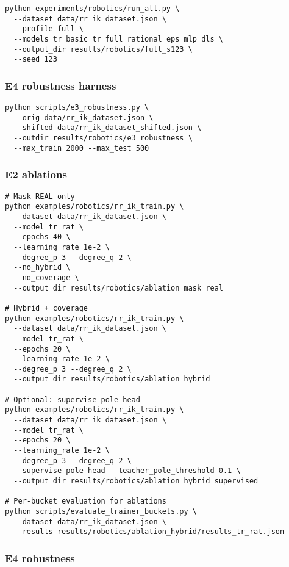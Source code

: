 \documentclass[11pt,twoside]{article}
\begin{document}
\begin{verbatim}
python experiments/robotics/run_all.py \
  --dataset data/rr_ik_dataset.json \
  --profile full \
  --models tr_basic tr_full rational_eps mlp dls \
  --output_dir results/robotics/full_s123 \
  --seed 123
\end{verbatim}

\subsubsection{E4 robustness harness}

\begin{verbatim}
python scripts/e3_robustness.py \
  --orig data/rr_ik_dataset.json \
  --shifted data/rr_ik_dataset_shifted.json \
  --outdir results/robotics/e3_robustness \
  --max_train 2000 --max_test 500
\end{verbatim}

\subsubsection{E2 ablations}

\begin{verbatim}
# Mask-REAL only
python examples/robotics/rr_ik_train.py \
  --dataset data/rr_ik_dataset.json \
  --model tr_rat \
  --epochs 40 \
  --learning_rate 1e-2 \
  --degree_p 3 --degree_q 2 \
  --no_hybrid \
  --no_coverage \
  --output_dir results/robotics/ablation_mask_real

# Hybrid + coverage
python examples/robotics/rr_ik_train.py \
  --dataset data/rr_ik_dataset.json \
  --model tr_rat \
  --epochs 20 \
  --learning_rate 1e-2 \
  --degree_p 3 --degree_q 2 \
  --output_dir results/robotics/ablation_hybrid

# Optional: supervise pole head
python examples/robotics/rr_ik_train.py \
  --dataset data/rr_ik_dataset.json \
  --model tr_rat \
  --epochs 20 \
  --learning_rate 1e-2 \
  --degree_p 3 --degree_q 2 \
  --supervise-pole-head --teacher_pole_threshold 0.1 \
  --output_dir results/robotics/ablation_hybrid_supervised

# Per-bucket evaluation for ablations
python scripts/evaluate_trainer_buckets.py \
  --dataset data/rr_ik_dataset.json \
  --results results/robotics/ablation_hybrid/results_tr_rat.json
\end{verbatim}

\subsubsection{E4 robustness}
\end{document}
